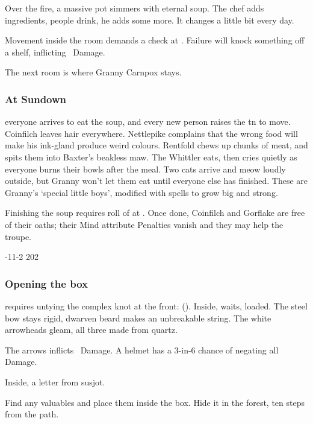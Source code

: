 \documentclass[10pt,twoside]{book}
\begin{document}
Over the fire, a massive pot simmers with eternal soup.
The chef adds ingredients, people drink, he adds some more.
It changes a little bit every day.

Movement inside the room demands a  check at \tn[8].
Failure will knock something off a shelf, inflicting ~Damage.

The next room is where Granny Carnpox stays.

\subsubsection{At Sundown}
everyone arrives to eat the soup, and every new person raises the \gls{tn} to move.
Coinfilch leaves hair everywhere.
Nettlepike complains that the wrong food will make his ink-gland produce weird colours.
Rentfold chews up chunks of meat, and spits them into Baxter's beakless maw.
The Whittler eats, then cries quietly as everyone burns their bowls after the meal.
Two cats arrive and meow loudly outside, but Granny won't let them eat until everyone else has finished.
These are Granny's `special little boys', modified with \glspl{spell} to grow big and strong.


Finishing the soup requires  roll of  at \tn[10].
Once done, Coinfilch and Gorflake are free of their oaths; their Mind \gls{attribute} Penalties vanish and they may help the troupe.

%
  {{-1}{1}{-2}}%
  {{2}{0}{2}}%
  {%
    \Dagger
  }%
  {}%
  {}%
  {}%

\setcounter{diceNo}{0}
\showStdSpells

\subsubsection{Opening the box}\label{insideTheBox}
requires untying the complex knot at the front:  (\tn[10]).
Inside,  waits, loaded.
The steel bow stays rigid, dwarven beard makes an unbreakable string.
The white arrowheads gleam, all three made from quartz.

The arrows inflicts ~Damage.
A helmet has a 3-in-6 chance of negating all Damage.

Inside, a letter from \gls{susjot}.

\begin{speechtext}
  Find any valuables and place them inside the box.
  Hide it in the forest, ten steps from the path.
\end{speechtext}
\end{document}

